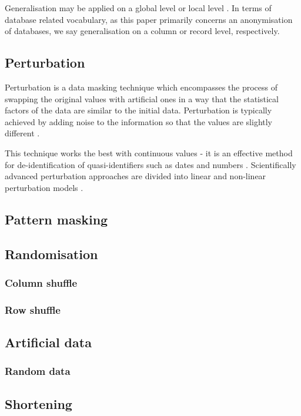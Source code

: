 \documentclass[a4paper,twoside,12pt]{book}
\begin{document}
Generalisation may be applied on a global level or local level \cite{bib:anonymization_extensive_study}. In terms of database related vocabulary, as this paper primarily concerns an anonymisation of databases, we say generalisation on a column or record level, respectively.



\subsection{Perturbation}

Perturbation is a data masking technique which encompasses the process of swapping the original values with artificial ones in a way that the statistical factors of the data are similar to the initial data. Perturbation is typically achieved by adding noise to the information so that the values are slightly different \cite{bib:anonymization_directory_structured}. 

This technique works the best with continuous values - it is an effective method for de-identification of quasi-identifiers such as dates and numbers \cite{bib:anonymisation_techniques_singapore}. Scientifically advanced perturbation approaches are divided into linear and non-linear perturbation models \cite{bib:perturbation_methods}.



\subsection{Pattern masking}
\subsection{Randomisation}
\subsubsection{Column shuffle}
\subsubsection{Row shuffle}
\subsection{Artificial data}
\subsubsection{Random data}
\subsection{Shortening}
\end{document}

